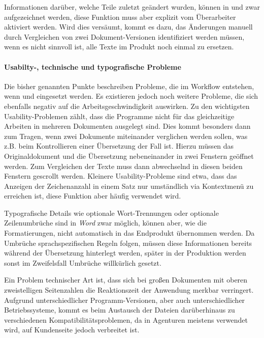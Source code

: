 Informationen darüber, welche Teile zuletzt geändert wurden, können in  und  zwar aufgezeichnet werden, diese Funktion muss aber explizit vom Überarbeiter aktiviert werden. Wird dies versäumt, kommt es dazu, das Änderungen manuell durch Vergleichen von zwei Dokument-Versionen identifiziert werden müssen, wenn es nicht sinnvoll ist, alle Texte im Produkt noch einmal zu ersetzen.

\paragraph{Usabilty-, technische und typografische Probleme} Die bisher genannten Punkte beschreiben Probleme, die im Workflow entstehen, wenn  und  eingesetzt werden. Es existieren jedoch noch weitere Probleme, die sich ebenfalls negativ auf die Arbeitsgeschwindigkeit auswirken. Zu den wichtigsten Usability-Problemen zählt, dass die Programme nicht für das gleichzeitige Arbeiten in mehreren Dokumenten ausgelegt sind. Dies kommt besonders dann zum Tragen, wenn zwei Dokumente miteinander verglichen werden sollen, was z.B. beim Kontrollieren einer Übersetzung der Fall ist. Hierzu müssen das Originaldokument und die Übersetzung nebeneinander in zwei Fenstern geöffnet werden. Zum Vergleichen der Texte muss dann abwechselnd in diesen beiden Fenstern gescrollt werden. Kleinere Usability-Probleme sind etwa, dass das Anzeigen der Zeichenanzahl in einem Satz nur umständlich via Kontextmenü zu erreichen ist, diese Funktion aber häufig verwendet wird. 

Typografische Details wie optionale Wort-Trennungen oder optionale Zeilenumbrüche sind in \emph{Word} zwar möglich, können aber, wie die Formatierungen, nicht automatisch in das Endprodukt übernommen werden. Da Umbrüche sprachspezifischen Regeln folgen, müssen diese Informationen bereits während der Übersetzung hinterlegt werden, später in der Produktion werden sonst im Zweifelsfall Umbrüche willkürlich gesetzt. 

Ein Problem technischer Art ist, dass sich bei großen Dokumenten mit oberen zweistelligen Seitenzahlen die Reaktionszeit der Anwendung merkbar verringert. Aufgrund unterschiedlicher Programm-Versionen, aber auch unterschiedlicher Betriebssysteme, kommt es beim Austausch der Dateien darüberhinaus zu verschiedenen Kompatibilitätsproblemen, da in Agenturen meistens  verwendet wird, auf Kundenseite jedoch  verbreitet ist.

